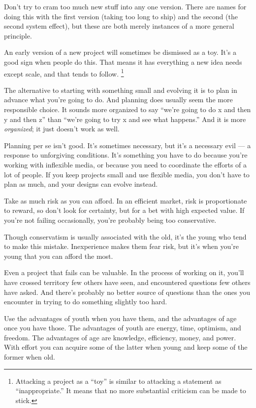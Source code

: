 Don't try to cram too much new stuff into any one version. There are
names for doing this with the first version (taking too long to ship)
and the second (the second system effect), but these are both merely
instances of a more general principle.

An early version of a new project will sometimes be dismissed as a toy.
It's a good sign when people do this. That means it has everything a new
idea needs except scale, and that tends to follow.
\footnote{Attacking a project as a ``toy'' is similar to attacking a
statement as ``inappropriate.'' It means that no more substantial
criticism can be made to stick.}

The alternative to starting with something small and evolving it is to
plan in advance what you're going to do. And planning does usually seem
the more responsible choice. It sounds more organized to say ``we're
going to do x and then y and then z'' than ``we're going to try x and
see what happens.'' And it is more \emph{organized}; it just doesn't
work as well.

Planning per se isn't good. It's sometimes necessary, but it's a
necessary evil --- a response to unforgiving conditions. It's something
you have to do because you're working with inflexible media, or because
you need to coordinate the efforts of a lot of people. If you keep
projects small and use flexible media, you don't have to plan as much,
and your designs can evolve instead.

Take as much risk as you can afford. In an efficient market, risk is
proportionate to reward, so don't look for certainty, but for a bet with
high expected value. If you're not failing occasionally, you're probably
being too conservative.

Though conservatism is usually associated with the old, it's the young
who tend to make this mistake. Inexperience makes them fear risk, but
it's when you're young that you can afford the most.

Even a project that fails can be valuable. In the process of working on
it, you'll have crossed territory few others have seen, and encountered
questions few others have asked. And there's probably no better source
of questions than the ones you encounter in trying to do something
slightly too hard.

Use the advantages of youth when you have them, and the advantages of
age once you have those. The advantages of youth are energy, time,
optimism, and freedom. The advantages of age are knowledge, efficiency,
money, and power. With effort you can acquire some of the latter when
young and keep some of the former when old.

